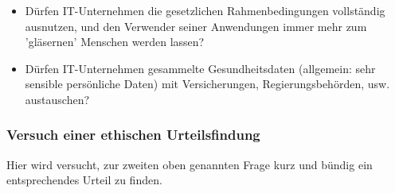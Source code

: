 \documentclass[letterpaper, 12pt]{article}
\let\tempsubsubsection\subsubsection
\renewcommand\subsubsection[1]{\vspace{0cm}\tempsubsubsection{#1}\vspace{0cm}}
\begin{document}
\begin{itemize}
	\item Dürfen IT-Unternehmen die gesetzlichen Rahmenbedingungen vollständig ausnutzen, und den Verwender seiner Anwendungen immer mehr zum 'gläsernen' Menschen werden lassen?
	\item Dürfen IT-Unternehmen gesammelte Gesundheitsdaten (allgemein: sehr sensible persönliche Daten) mit Versicherungen, Regierungsbehörden, usw. austauschen?
\end{itemize}

\subsubsection{Versuch einer ethischen Urteilsfindung}

Hier wird versucht, zur zweiten oben genannten Frage kurz und bündig ein entsprechendes Urteil zu finden.
\end{document}
